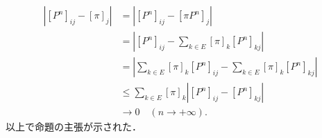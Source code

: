 \begin{prf}
\begin{description}
		\begin{align}
			\left| [P^n]_{ij} - [\pi]_j \right| &= \left| [P^n]_{ij} - [\pi P^n]_j \right| \\
			&= \left| [P^n]_{ij} - \sum_{k \in E}[\pi]_k[P^n]_{kj} \right| \\
			&= \left| \sum_{k \in E}[\pi]_k[P^n]_{ij} - \sum_{k \in E}[\pi]_k[P^n]_{kj} \right| \\
			&\leq \sum_{k \in E}[\pi]_k\left| [P^n]_{ij} - [P^n]_{kj} \right| \\
			&\longrightarrow 0 \quad (n \longrightarrow +\infty).
		\end{align}
		以上で命題の主張が示された．
		\QED
	\end{description}
	\end{prf}
	
	
	
	